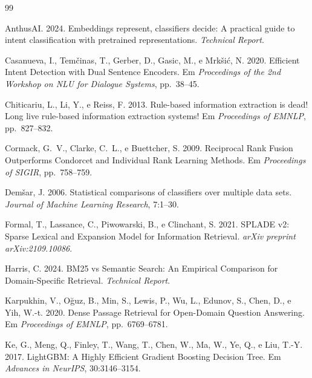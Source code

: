 \documentclass[11pt]{article}
\begin{document}
\begingroup
\small
\begin{thebibliography}{99}

AnthusAI. 2024.
\newblock Embeddings represent, classifiers decide: A practical guide to intent classification with pretrained representations.
\newblock \emph{Technical Report}.

Casanueva, I., Tem\v{c}inas, T., Gerber, D., Gasic, M., e Mrk\v{s}i\'{c}, N. 2020.
\newblock Efficient Intent Detection with Dual Sentence Encoders.
\newblock Em \emph{Proceedings of the 2nd Workshop on NLU for Dialogue Systems}, pp.~38--45.

Chiticariu, L., Li, Y., e Reiss, F. 2013.
\newblock Rule-based information extraction is dead! Long live rule-based information extraction systems!
\newblock Em \emph{Proceedings of EMNLP}, pp.~827--832.

Cormack, G.~V., Clarke, C.~L., e Buettcher, S. 2009.
\newblock Reciprocal Rank Fusion Outperforms Condorcet and Individual Rank Learning Methods.
\newblock Em \emph{Proceedings of SIGIR}, pp.~758--759.

Dem\v{s}ar, J. 2006.
\newblock Statistical comparisons of classifiers over multiple data sets.
\newblock \emph{Journal of Machine Learning Research}, 7:1--30.

Formal, T., Lassance, C., Piwowarski, B., e Clinchant, S. 2021.
\newblock SPLADE v2: Sparse Lexical and Expansion Model for Information Retrieval.
\newblock \emph{arXiv preprint arXiv:2109.10086}.

Harris, C. 2024.
\newblock BM25 vs Semantic Search: An Empirical Comparison for Domain-Specific Retrieval.
\newblock \emph{Technical Report}.

Karpukhin, V., O\u{g}uz, B., Min, S., Lewis, P., Wu, L., Edunov, S., Chen, D., e Yih, W.-t. 2020.
\newblock Dense Passage Retrieval for Open-Domain Question Answering.
\newblock Em \emph{Proceedings of EMNLP}, pp.~6769--6781.

Ke, G., Meng, Q., Finley, T., Wang, T., Chen, W., Ma, W., Ye, Q., e Liu, T.-Y. 2017.
\newblock LightGBM: A Highly Efficient Gradient Boosting Decision Tree.
\newblock Em \emph{Advances in NeurIPS}, 30:3146--3154.


\end{thebibliography}
\end{document}
